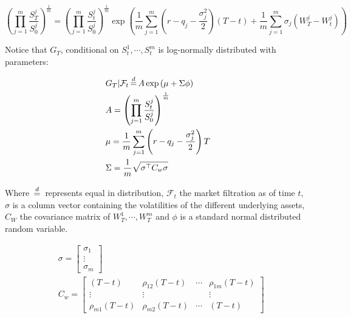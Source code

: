 \begin{equation}\label{eq:geom_digital_distrib}
\left(\prod_{j=1}^m\frac{S_{T}^{j}}{S_{0}^{j}}\right)^{\frac{1}{m}} =\left(\prod_{j=1}^m\frac{S_{t}^{j}}{S_{0}^{j}}\right)^{\frac{1}{m}}\exp\left(\frac{1}{m} \sum_{j=1}^{m}\left(r-q_{j}-\frac{\sigma_{j}^{2}}{2}\right) \left(T-t\right)+\frac{1}{m} \sum_{j=1}^{m} \sigma_{j} \left(W_{T}^{j}-W_{t}^{j}\right)\right) 
\end{equation}

Notice that $G_T$, conditional on $S_t^1,\cdots,S_t^m$ is log-normally distributed with parameters:



\begin{equation} 
\label{eq:geom_digital_distrib_params1}
\begin{aligned} 
& G_T|\mathcal{F}_t \eqdistr A \exp\left(\mu+\Sigma\phi\right)\\
& A = \left(\prod_{j=1}^m\frac{S_{t}^{j}}{S_{0}^{j}}\right)^{\frac{1}{m}} \\
&\mu = \frac{1}{m}\sum_{j=1}^{m}\left(r-q_{j}-\frac{\sigma_{j}^{2}}{2}\right)T \\   
& \Sigma=\frac{1}{m}\sqrt{\sigma^{\top} C_{w} \sigma}
\end{aligned}
\end{equation}

Where $\eqdistr$ represents equal in distribution, $\mathcal{F}_t$ the market filtration as of time $t$, $\sigma$ is a column vector containing the volatilities of the different underlying assets, $C_W$ the covariance matrix of $W_T^1,\cdots,W_T^m$ and $\phi$ is a standard normal distributed random variable.

\begin{equation} \label{eq:geom_digital_distrib_params2}
\begin{aligned}
&\sigma=\left[\begin{array}{c}
\sigma_{1} \\
\vdots \\
\sigma_{m}
\end{array}\right] \\
&C_{w}=\left[\begin{array}{cccc}
\left(T-t\right) & \rho_{12} \left(T-t\right) & \cdots & \rho_{1 m} \left(T-t\right) \\
\vdots & \vdots & & \vdots \\
\rho_{m 1} \left(T-t\right) & \rho_{m 2} \left(T-t\right) & \cdots &  \left(T-t\right)
\end{array}\right]
\end{aligned}
\end{equation} 

